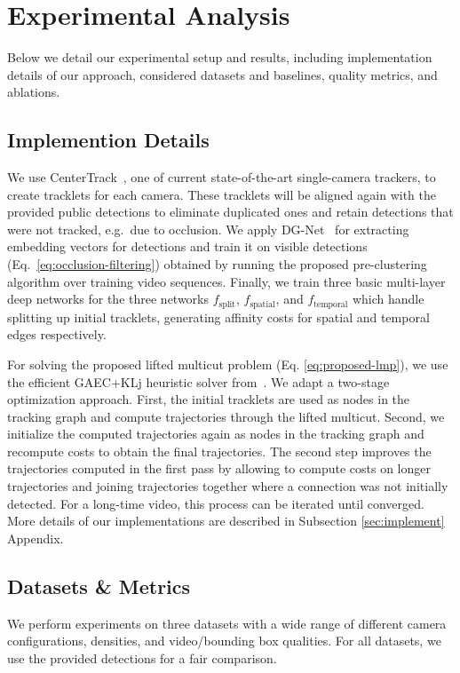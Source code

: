 \section{Experimental Analysis}
Below we detail our experimental setup and results, including implementation details of our approach, considered datasets and baselines, quality metrics, and ablations.





\subsection{Implemention Details}

We use CenterTrack~\cite{zhou2020tracking}, one of current state-of-the-art single-camera trackers, to create tracklets for each camera.
These tracklets will be aligned again with the provided public detections to eliminate duplicated ones and retain detections that were not tracked, e.g.\ due to occlusion.
We apply DG-Net~\cite{zheng2019joint} for extracting embedding vectors for detections and train it on visible detections (Eq.~\ref{eq:occlusion-filtering}) obtained by running the proposed pre-clustering algorithm over training video sequences.
Finally, we train three basic multi-layer deep networks for the three networks $f_{\mathrm{split}}$, $f_{\mathrm{spatial}}$, and $f_{\mathrm{temporal}}$ which handle splitting up initial tracklets, generating affinity costs for spatial and temporal edges respectively.

For solving the proposed lifted multicut problem (Eq. \ref{eq:proposed-lmp}), we use the efficient GAEC+KLj heuristic solver from~\cite{keuper2015lifted}.
We adapt a two-stage optimization approach. First, the initial tracklets are used as nodes in the tracking graph and compute trajectories through the lifted multicut.
Second, we initialize the computed trajectories again as nodes in the tracking graph and recompute costs to obtain the final trajectories. The second step improves the trajectories computed in the first pass by allowing to compute costs on longer trajectories and joining trajectories together where a connection was not initially detected. For a long-time video, this process can be iterated until converged. More details of our implementations are described in Subsection \ref{sec:implement} Appendix.


\subsection{Datasets \& Metrics}
We perform experiments on three datasets with a wide range of different camera configurations, densities, and video/bounding box qualities.
For all datasets, we use the provided detections for a fair comparison.

